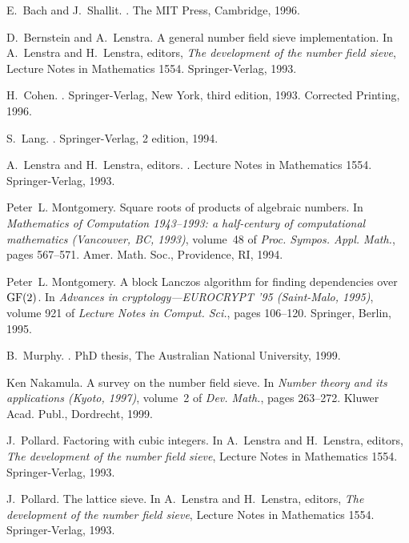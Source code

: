 \documentclass[12pt]{article}
\begin{document}
\begin{thebibliography}{10}

E.~Bach and J.~Shallit.
.
\newblock The MIT Press, Cambridge, 1996.

D.~Bernstein and A.~Lenstra.
\newblock A general number field sieve implementation.
\newblock In A.~Lenstra and H.~Lenstra, editors, {\em The development of the
  number field sieve}, Lecture Notes in Mathematics 1554. Springer-Verlag,
  1993.

H.~Cohen.
.
\newblock Springer-Verlag, New York, third edition, 1993.
\newblock Corrected Printing, 1996.

S.~Lang.
.
\newblock Springer-Verlag, 2 edition, 1994.

A.~Lenstra and H.~Lenstra, editors.
.
\newblock Lecture Notes in Mathematics 1554. Springer-Verlag, 1993.

Peter~L. Montgomery.
\newblock Square roots of products of algebraic numbers.
\newblock In {\em Mathematics of Computation 1943--1993: a half-century of
  computational mathematics (Vancouver, BC, 1993)}, volume~48 of {\em Proc.
  Sympos. Appl. Math.}, pages 567--571. Amer. Math. Soc., Providence, RI, 1994.

Peter~L. Montgomery.
\newblock A block {L}anczos algorithm for finding dependencies over {${\rm
  GF}(2)$}.
\newblock In {\em Advances in cryptology---EUROCRYPT '95 (Saint-Malo, 1995)},
  volume 921 of {\em Lecture Notes in Comput. Sci.}, pages 106--120. Springer,
  Berlin, 1995.

B.~Murphy.
.
\newblock PhD thesis, The Australian National University, 1999.

Ken Nakamula.
\newblock A survey on the number field sieve.
\newblock In {\em Number theory and its applications (Kyoto, 1997)}, volume~2
  of {\em Dev. Math.}, pages 263--272. Kluwer Acad. Publ., Dordrecht, 1999.

J.~Pollard.
\newblock Factoring with cubic integers.
\newblock In A.~Lenstra and H.~Lenstra, editors, {\em The development of the
  number field sieve}, Lecture Notes in Mathematics 1554. Springer-Verlag,
  1993.

J.~Pollard.
\newblock The lattice sieve.
\newblock In A.~Lenstra and H.~Lenstra, editors, {\em The development of the
  number field sieve}, Lecture Notes in Mathematics 1554. Springer-Verlag,
  1993.

\end{thebibliography}
\end{document}
